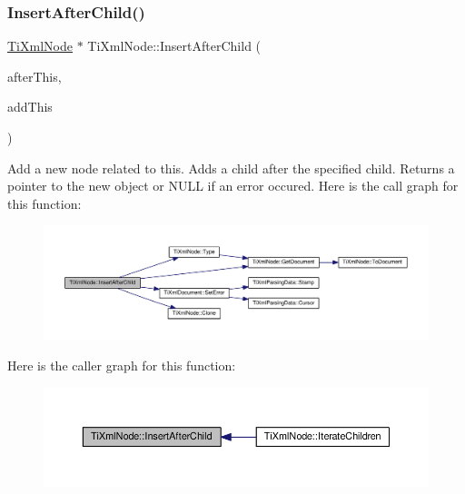 \subsubsection{\texorpdfstring{Insert\+After\+Child()}{InsertAfterChild()}}
{\footnotesize\ttfamily \hyperlink{class_ti_xml_node}{Ti\+Xml\+Node} $\ast$ Ti\+Xml\+Node\+::\+Insert\+After\+Child (\begin{DoxyParamCaption}\item[{\hyperlink{class_ti_xml_node}{Ti\+Xml\+Node} $\ast$}]{after\+This,  }\item[{const \hyperlink{class_ti_xml_node}{Ti\+Xml\+Node} \&}]{add\+This }\end{DoxyParamCaption})}

Add a new node related to this. Adds a child after the specified child. Returns a pointer to the new object or N\+U\+LL if an error occured. Here is the call graph for this function\+:
\nopagebreak
\begin{figure}[H]
\begin{center}
\leavevmode
\includegraphics[width=350pt]{class_ti_xml_node_a274db3292218202805c093f66a964cb5_cgraph}
\end{center}
\end{figure}
Here is the caller graph for this function\+:
\nopagebreak
\begin{figure}[H]
\begin{center}
\leavevmode
\includegraphics[width=350pt]{class_ti_xml_node_a274db3292218202805c093f66a964cb5_icgraph}
\end{center}
\end{figure}
\mbox{\label{class_ti_xml_node_a71e54e393336382bc9875f64aab5cb15}} 
